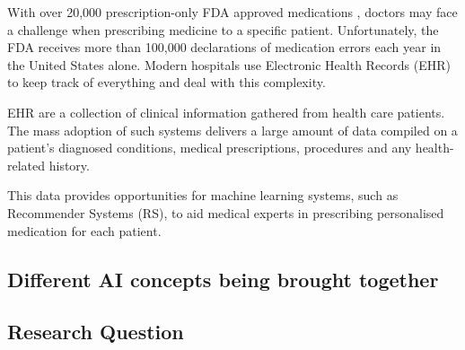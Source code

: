 With over 20,000 prescription-only FDA approved
medications \cite{Sun}, doctors may face a challenge when
prescribing medicine to a specific patient.
Unfortunately, the FDA receives more than 100,000
declarations of medication errors each year in the
United States alone. Modern hospitals use Electronic
Health Records (EHR) to keep track of everything and
deal with this complexity. 

EHR are a collection of clinical information gathered
from health care patients. The mass adoption of such
systems delivers a large amount of data compiled on a
patient's diagnosed conditions, medical prescriptions,
procedures and any health-related history.

This data provides opportunities for machine learning
systems, such as Recommender Systems (RS), to aid
medical experts in prescribing personalised medication
for each patient.


\subsection{Different AI concepts being brought together }

\subsection{Research Question}

